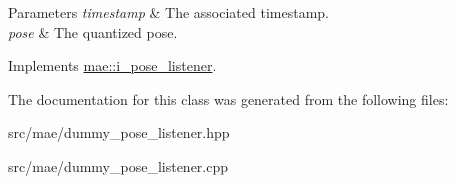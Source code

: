 \begin{DoxyParams}{Parameters}
{\em timestamp} & The associated timestamp. \\
\hline
{\em pose} & The quantized pose. \\
\hline
\end{DoxyParams}


Implements \hyperlink{classmae_1_1i__pose__listener_a1b7584ba2ad90a2b862d779cb3cba6f5}{mae\-::i\-\_\-pose\-\_\-listener}.



The documentation for this class was generated from the following files\-:\begin{DoxyCompactItemize}
\item 
src/mae/dummy\-\_\-pose\-\_\-listener.\-hpp\item 
src/mae/dummy\-\_\-pose\-\_\-listener.\-cpp\end{DoxyCompactItemize}
